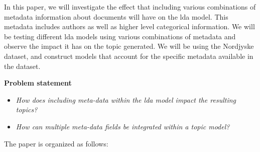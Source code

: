 In this paper, we will investigate the effect that including various combinations of metadata information about documents will have on the \gls{lda} model.
This metadata includes authors as well as higher level categorical information.
We will be testing different \gls{lda} models using various combinations of metadata and observe the impact it has on the topic generated.
We will be using the Nordjyske dataset, and construct models that account for the specific metadata available in the dataset.

\textbf{Problem statement}
\begin{itemize}
	\item \textit{How does including meta-data within the \gls{lda} model impact the resulting topics?}
	\item \textit{How can multiple meta-data fields be integrated within a topic model?}
\end{itemize}
	
The paper is organized as follows: 
